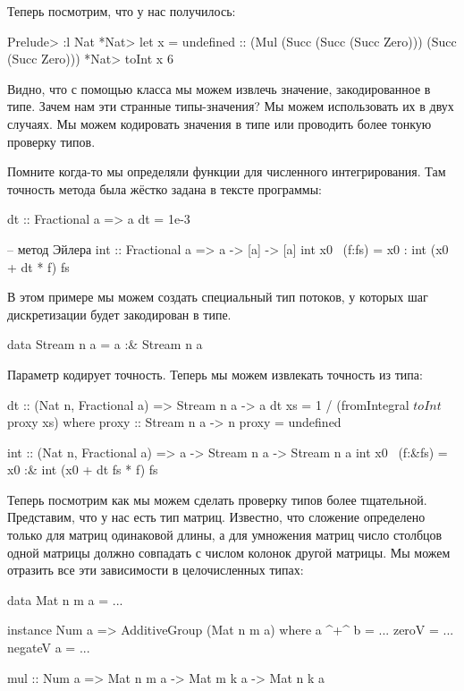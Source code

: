 Теперь посмотрим, что у нас получилось:


\begin{code}
Prelude> :l Nat
*Nat> let x = undefined :: (Mul (Succ (Succ (Succ Zero))) (Succ (Succ Zero)))
*Nat> toInt x
6
\end{code}

Видно, что с помощью класса  мы можем извлечь значение,
закодированное в типе. Зачем нам эти странные типы-значения? Мы можем
использовать их в двух случаях. Мы можем кодировать значения в типе или
проводить более тонкую проверку типов.

Помните когда-то мы определяли функции для численного интегрирования.
Там точность метода была жёстко задана в тексте программы:


\begin{code}

dt :: Fractional a => a
dt = 1e-3

-- метод Эйлера
int :: Fractional a => a -> [a] -> [a]
int x0 ~(f:fs) = x0 : int (x0 + dt * f) fs
\end{code}

В этом примере мы можем создать специальный тип потоков, у которых шаг
дискретизации будет закодирован в типе.


\begin{code}
data Stream n a = a :& Stream n a
\end{code}

Параметр  кодирует точность. Теперь мы можем извлекать точность из
типа:


\begin{code}
dt :: (Nat n, Fractional a) => Stream n a -> a
dt xs = 1 / (fromIntegral $ toInt $ proxy xs)
    where proxy :: Stream n a -> n
          proxy = undefined

int :: (Nat n, Fractional a) => a -> Stream n a -> Stream n a
int x0 ~(f:&fs) = x0 :& int (x0 + dt fs * f) fs
\end{code}

Теперь посмотрим как мы можем сделать проверку типов более тщательной.
Представим, что у нас есть тип матриц. Известно, что сложение определено
только для матриц одинаковой длины, а для умножения матриц число
столбцов одной матрицы должно совпадать с числом колонок другой матрицы.
Мы можем отразить все эти зависимости в целочисленных типах:


\begin{code}
data Mat n m a = ...

instance Num a => AdditiveGroup (Mat n m a) where
    a ^+^ b     = ...
    zeroV       = ...
    negateV a   = ...

mul :: Num a => Mat n m a -> Mat m k a -> Mat n k a
\end{code}


